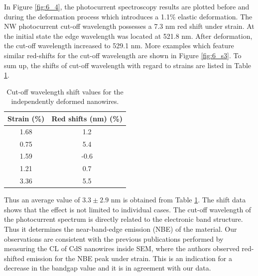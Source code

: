 In Figure \ref{fig:6_4}, the photocurrent spectroscopy results are plotted before and during the deformation process which introduces a 1.1\% elastic deformation.
The NW photocurrent cut-off wavelength possesses a 7.3 nm red shift under strain. At the initial state the edge wavelength was located at 521.8 nm. After deformation, the cut-off wavelength increased to 529.1 nm. 
More examples which feature similar red-shifts for the cut-off wavelength are shown in Figure \ref{fig:6_s3}. 
To sum up, the shifts of cut-off wavelength with regard to strains are listed in Table \ref{tab:6_1}. 

\begin{table}[b]
    \centering
    \begin{tabular}{c|c}
    \hline
         Strain (\%) & Red shifts (nm) (\%)\\
         \hline
         1.68 & 1.2\\
         0.75 & 5.4\\
         1.59 & -0.6\\
         1.21 & 0.7\\
         3.36 & 5.5\\
         \hline
    \end{tabular}
    \caption{Cut-off wavelength shift values for the independently deformed nanowires.}
    \label{tab:6_1}
\end{table}

Thus an average value of $3.3\pm2.9$ nm is obtained from Table \ref{tab:6_1}. The shift data shows that the effect is not limited to individual cases. 
The cut-off wavelength of the photocurrent spectrum is directly related to the electronic band structure. Thus it determines the near-band-edge emission (NBE) of the material. 
Our observations are consistent with the previous publications performed by measuring the CL of CdS nanowires inside SEM, where the authors observed red-shifted emission for the NBE peak under strain. 
This is an indication for a decrease in the bandgap value and it is in agreement with our data.\cite{Fu2011}

